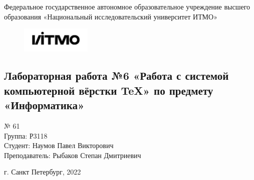 \begin{center}
\large
Федеральное государственное автономное образовательное учреждение высшего образования
«Национальный исследовательский университет ИТМО»
\end{center}
\begin{figure}[h]
\centering
\includegraphics[width=0.3\textwidth]{logo_itmo}
\end{figure}
\vspace{1cm}
\begin{center}
\section*{Лабораторная работа №6 «Работа с системой компьютерной вёрстки \TeX» по предмету \\«Информатика»}
\end{center}
\vspace{9cm}
\begin{flushright}
 № 61\\Группа: Р3118\\Студент: Наумов Павел Викторович\\Преподаватель: Рыбаков Степан Дмитриевич\\
\end{flushright}
\vspace{3cm}
\begin{center}
\vspace{2cm}
г. Санкт Петербург, 2022
\end{center}
\thispagestyle{empty}

